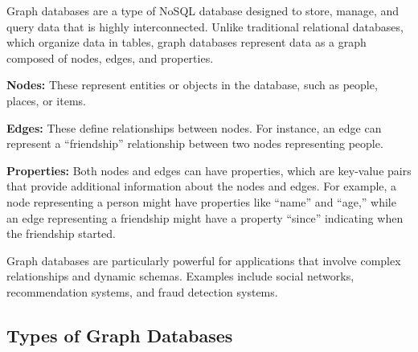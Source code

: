 Graph databases are a type of NoSQL database designed to store, manage, and query data that is highly interconnected. Unlike traditional relational databases, which organize data in tables, graph databases represent data as a graph composed of nodes, edges, and properties.

\textbf{Nodes:} These represent entities or objects in the database, such as people, places, or items.

\textbf{Edges:} These define relationships between nodes. For instance, an edge can represent a ``friendship'' relationship between two nodes representing people.

\textbf{Properties:} Both nodes and edges can have properties, which are key-value pairs that provide additional information about the nodes and edges. For example, a node representing a person might have properties like ``name'' and ``age,'' while an edge representing a friendship might have a property ``since'' indicating when the friendship started.

Graph databases are particularly powerful for applications that involve complex relationships and dynamic schemas. Examples include social networks, recommendation systems, and fraud detection systems.

\subsection{Types of Graph Databases}

